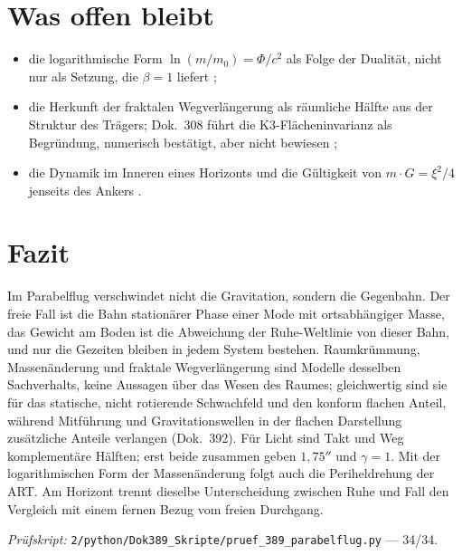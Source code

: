 \section{Was offen bleibt}

\begin{itemize}[leftmargin=*,itemsep=1pt]
\item die logarithmische Form $\ln(m/m_0)=\Phi/c^2$ als Folge der Dualität, nicht nur als
Setzung, die $\beta=1$ liefert \SM;
\item die Herkunft der fraktalen Wegverlängerung als räumliche Hälfte aus der Struktur des
Trägers; Dok.~308 führt die K3-Flächeninvarianz als Begründung, numerisch bestätigt, aber nicht
bewiesen \KM;
\item die Dynamik im Inneren eines Horizonts und die Gültigkeit von $m\cdot G=\xi^2/4$ jenseits
des Ankers \SM.
\end{itemize}

\section{Fazit}

Im Parabelflug verschwindet nicht die Gravitation, sondern die Gegenbahn. Der freie Fall ist die
Bahn stationärer Phase einer Mode mit ortsabhängiger Masse, das Gewicht am Boden ist die
Abweichung der Ruhe-Weltlinie von dieser Bahn, und nur die Gezeiten bleiben in jedem System
bestehen. Raumkrümmung, Massenänderung und fraktale Wegverlängerung sind Modelle desselben
Sachverhalts, keine Aussagen über das Wesen des Raumes; gleichwertig sind sie für das statische,
nicht rotierende Schwachfeld und den konform flachen Anteil, während Mitführung und
Gravitationswellen in der flachen Darstellung zusätzliche Anteile verlangen (Dok.~392). Für Licht sind Takt und Weg
komplementäre Hälften; erst beide zusammen geben $1{,}75''$ und $\gamma=1$. Mit der
logarithmischen Form der Massenänderung folgt auch die Periheldrehung der ART. Am Horizont trennt
dieselbe Unterscheidung zwischen Ruhe und Fall den Vergleich mit einem fernen Bezug vom freien
Durchgang.

\vspace{1em}
\noindent\textit{Prüfskript:} \texttt{2/python/Dok389\_Skripte/pruef\_389\_parabelflug.py}
--- 34/34.
